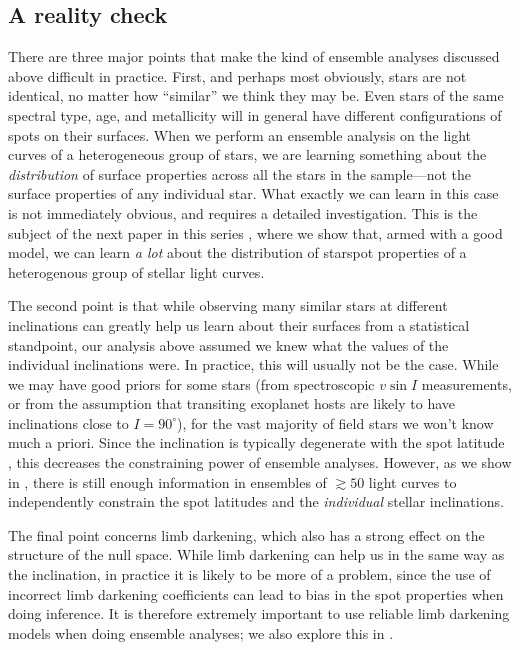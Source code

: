 \documentclass[modern]{aastex62}
\begin{document}
\subsection{A reality check}
\label{sec:reality-check}

There are three major points that make the kind of ensemble
analyses discussed above difficult in practice. First, and perhaps
most obviously, stars are
not identical, no matter how ``similar'' we think they may be.
Even stars of the same spectral type, age, and metallicity will
in general have different configurations of spots on their surfaces.
When we perform an ensemble analysis on the light curves of a
heterogeneous group of stars, we are learning something about the
\emph{distribution} of surface properties across all the stars in
the sample---not the surface properties of any individual star.
What exactly we can learn in this case is not immediately obvious,
and requires a detailed investigation. This is the subject of
the next paper in this series , where we show that,
armed with a good model,
we can learn \emph{a lot} about the distribution of starspot
properties of a heterogenous group of stellar light curves.

The second point is that while observing many similar stars at different
inclinations can greatly help us learn about their surfaces from a
statistical standpoint, our analysis
above assumed we knew what the values of the individual inclinations were.
In practice, this will usually not be the case. While we may have
good priors for some stars (from spectroscopic $v\sin I$ measurements,
or from the assumption that transiting exoplanet hosts are likely
to have inclinations close to $I=90^\circ$), for the vast majority
of field stars we won't know much a priori. Since the inclination
is typically degenerate with the spot latitude \citep[e.g.,][]{Walkowicz2013},
this decreases the constraining power of ensemble analyses.
However, as we show in , there is still enough
information in ensembles of $\gtrsim 50$ light curves
to independently constrain the spot latitudes
and the \emph{individual} stellar inclinations.

The final point concerns limb darkening, which also has a strong
effect on the structure of the null space. While limb darkening can
help us in the same way as the inclination, in practice it is likely to be more
of a problem, since the use of incorrect limb darkening coefficients can lead
to bias in the spot properties when doing inference.
It is therefore extremely important to use reliable limb darkening models
when doing ensemble analyses; we also explore this in .
\end{document}
